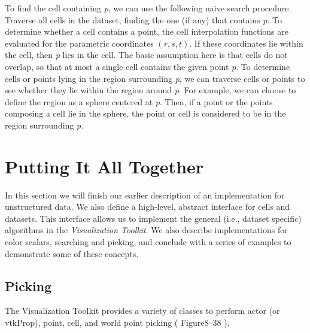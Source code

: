 To find the cell containing \emph{p}, we can use the following naive search procedure.
Traverse all cells in the dataset, finding the one (if any) that contains \emph{p}.
To determine whether a cell contains a point, the cell interpolation functions are evaluated for the parametric coordinates $(r,s,t)$.
If these coordinates lie within the cell, then \emph{p} lies in the cell.
The basic assumption here is that cells do not overlap, so that at most a single cell contains the given point \emph{p}.
To determine cells or points lying in the region surrounding \emph{p}, we can traverse cells or points to see whether they lie within the region around \emph{p}.
For example, we can choose to define the region as a sphere centered at \emph{p}.
Then, if a point or the points composing a cell lie in the sphere, the point or cell is considered to be in the region surrounding \emph{p}.

\section{Putting It All Together}
In this section we will finish our earlier description of an implementation for unstructured data. We also define a high-level, abstract interface for cells and datasets. This interface allows us to implement the general (i.e., dataset specific) algorithms in the \emph{Visualization Toolkit}. We also describe
implementations for color scalars, searching and picking, and conclude with a series of examples to demonstrate some of these concepts.

\subsection{Picking}
\label{sec:picking}

The Visualization Toolkit provides a variety of classes to perform actor (or vtkProp), point, cell, and
world point picking ( Figure8–38 ).